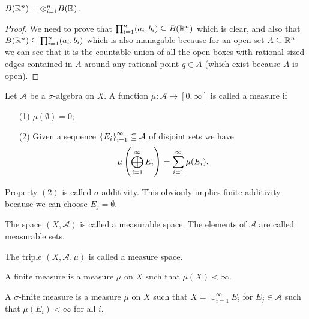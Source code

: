 \documentclass[11pt,a4paper]{article}
\newcommand{\A}{\mathcal A}
\begin{document}
\begin{proposition}
  $B(\mathbb{R}^n) = \otimes_{i=1}^{n} B(\mathbb{R})$.
\end{proposition}
\begin{proof}
  We need to prove that $\prod_{i=1}^{n} (a_i, b_i) \subseteq B(\mathbb{R}^n)$
  which is clear, and also that $B(\mathbb{R}^n) \subseteq \prod_{i=1}^{n} (a_i, b_i)$
  which is also managable because for an open set $A \subseteq \mathbb{R}^n$ we
  can see that it is the countable union of all the open boxes with
  rational sized edges contained in $A$ around any rational point $q \in A$
  (which exist because $A$ is open).
\end{proof}

\begin{definition}[Measure]
  Let $\A$ be a $\sigma$-algebra on $X$.
  A function $\mu \colon \A \to [0,\infty]$ is called a measure if
  \begin{enumerate}
  \item[(1)] $\mu(\emptyset) = 0$;
  \item[(2)] Given a sequence $\set{E_i}_{i=1}^{\infty} \subseteq \A$ of
    disjoint sets we have
    \[
      \mu\del{\bigoplus_{i=1}^{\infty} E_i} =
      \sum_{i=1}^{\infty} \mu(E_i).
    \]
  \end{enumerate}
\end{definition}
\begin{remark}
  Property $(2)$ is called $\sigma$-additivity.
  This obviouly implies finite additivity because we can choose 
  $E_j = \emptyset$.
\end{remark}

\begin{definition}
  The space $(X,\A)$ is called a measurable space.
  The elements of $\A$ are called measurable sets.
\end{definition}

\begin{definition}
  The triple $(X,\A,\mu)$ is called a measure space.
\end{definition}

\begin{definition}
  A finite measure is a measure $\mu$ on $X$ such that $\mu(X) < \infty$.
\end{definition}

\begin{definition}
  A $\sigma$-finite measure is a measure $\mu$ on $X$ such that
  $X = \cup_{i=1}^{\infty} E_i$ for $E_j \in \A$ such that $\mu(E_i) < \infty$
  for all $i$.
\end{definition}
\end{document}
